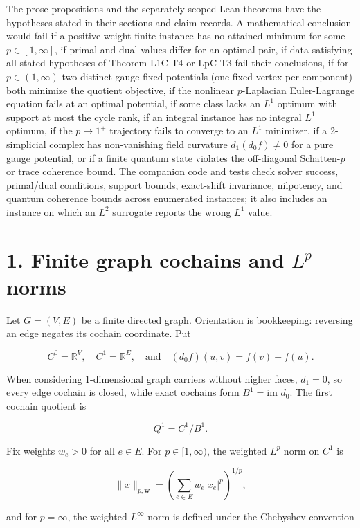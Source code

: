 \documentclass[
]{article}
\begin{document}
The prose propositions and the separately scoped Lean theorems have the hypotheses stated in their sections and claim records. A mathematical conclusion would fail if a positive-weight finite instance has no attained
minimum for some \(p \in [1, \infty]\), if primal and dual values differ for an
optimal pair, if data satisfying all stated hypotheses of Theorem L1C-T4 or
LpC-T3 fail their conclusions, if for \(p \in (1, \infty)\) two distinct gauge-fixed potentials (one fixed vertex per component)
both minimize the quotient objective, if the nonlinear \(p\)-Laplacian Euler-Lagrange
equation fails at an optimal potential, if some class lacks an \(L^1\) optimum with
support at most the cycle rank, if an integral instance has no integral \(L^1\) optimum,
if the \(p \to 1^+\) trajectory fails to converge to an \(L^1\) minimizer, if a
2-simplicial complex has non-vanishing field curvature \(d_1(d_0 f) \ne 0\) for a
pure gauge potential, or if a finite quantum state violates the off-diagonal
Schatten-\(p\) or trace coherence bound. The companion code and tests check solver
success, primal/dual conditions, support bounds, exact-shift invariance,
nilpotency, and quantum coherence bounds across enumerated instances; it also
includes an instance on which an \(L^2\) surrogate reports the wrong \(L^1\) value.

\section{\texorpdfstring{1. Finite graph cochains and \(L^p\) norms}{1. Finite graph cochains and L\^{}p norms}}\label{finite-graph-cochains-and-lp-norms}

Let \(G = (V,E)\) be a finite directed graph. Orientation is bookkeeping: reversing
an edge negates its cochain coordinate. Put

\[C^0 = \mathbb{R}^V, \quad C^1 = \mathbb{R}^E, \quad \text{and} \quad (d_0 f)(u,v) = f(v) - f(u).\]

When considering 1-dimensional graph carriers without higher faces, \(d_1 = 0\), so every edge cochain is closed, while exact
cochains form \(B^1 = \text{im } d_0\). The first cochain quotient is

\[Q^1 = C^1 / B^1.\]

Fix weights \(w_e > 0\) for all \(e \in E\). For \(p \in [1, \infty)\), the weighted \(L^p\) norm on \(C^1\) is

\[\|x\|_{p,\mathbf{w}} = \left( \sum_{e \in E} w_e |x_e|^p \right)^{1/p},\]

and for \(p = \infty\), the weighted \(L^\infty\) norm is defined under the Chebyshev convention
\end{document}
